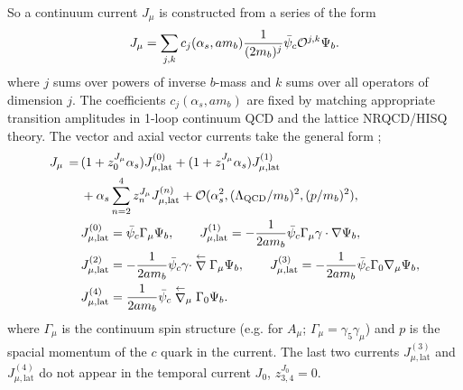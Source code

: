 So a continuum current $J_{\mu}$ is constructed from a series of the form
\begin{align}
  J_{\mu} = \sum_{j,k} c_j(\alpha_s,am_b) {1\over (2m_b)^j} \bar{\psi}_c \mathcal{O}^{j,k} \Psi_b.
\end{align}
where $j$ sums over powers of inverse $b$-mass and $k$ sums over all operators of dimension $j$. The coefficients $c_j(\alpha_s,am_b)$ are fixed by matching appropriate transition amplitudes in 1-loop continuum QCD and the lattice NRQCD/HISQ theory. The vector and axial vector currents take the general form \cite{PhysRevD.59.094504};
\begin{align}
	J_{\mu} \,=\, & ( 1 + z^{J_{\mu}}_0 \alpha_s ) J_{\mu,\text{lat}}^{(0)} + ( 1 + z^{J_{\mu}}_1 \alpha_s ) J_{\mu,\text{lat}}^{(1)} \nonumber \\ &+ \alpha_s \sum_{n=2}^4 z^{J_{\mu}}_n J_{\mu,\text{lat}}^{(n)} + \mathcal{O}( \alpha_s^2, (\Lambda_{\text{QCD}}/m_b)^2, (p/m_b)^2 ),
	\label{eq:nrqcd-hisq-current}
        \\
        & J_{\mu,\text{lat}}^{(0)} = \bar{\psi}_c \Gamma_{\mu} \Psi_b,
        \quad\quad J_{\mu,\text{lat}}^{(1)} = -{1\over 2am_b} \bar{\psi}_c \Gamma_{\mu} \gamma\cdot \nabla \Psi_b,
        \nonumber
        \\
        & J_{\mu,\text{lat}}^{(2)} = -{1\over 2am_b} \bar{\psi}_c \gamma\cdot \stackrel{\leftarrow}{\nabla} \Gamma_{\mu} \Psi_b,
        \nonumber
        \quad\quad J_{\mu,\text{lat}}^{(3)} = -{1\over 2am_b}  \bar{\psi}_c \Gamma_0 \nabla_{\mu} \Psi_b,
        \nonumber
        \\
        & J_{\mu,\text{lat}}^{(4)} = {1\over 2am_b} \bar{\psi}_c \stackrel{\leftarrow}{\nabla}_{\mu} \Gamma_0 \Psi_b.
        \nonumber
\end{align}
where $\Gamma_{\mu}$ is the continuum spin structure (e.g. for $A_{\mu}$; $\Gamma_{\mu}=\gamma_5\gamma_{\mu}$) and $p$ is the spacial momentum of the $c$ quark in the current. The last two currents $J^{(3)}_{\mu,\text{lat}}$ and $J^{(4)}_{\mu,\text{lat}}$ do not appear in the temporal current $J_0$, $z_{3,4}^{J_0} = 0$.

